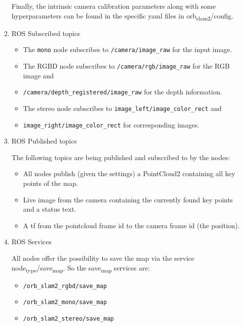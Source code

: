 \documentclass[unrestricted]{meetingnotesminutes}
\begin{document}
\begin{enumerate}
Finally, the intrinsic camera calibration parameters along with some hyperparameters can be found in the specific yaml files in orb\textsubscript{slam2}/config.

\item ROS Subscribed topics
\label{sec:org2778b5f}

\begin{itemize}
\item The \texttt{mono} node subscribes to \texttt{/camera/image\_raw} for the input image.
\item The RGBD node subscribes to \texttt{/camera/rgb/image\_raw} for the RGB image and
\item \texttt{/camera/depth\_registered/image\_raw} for the depth information.
\item The stereo node subscribes to \texttt{image\_left/image\_color\_rect} and
\item \texttt{image\_right/image\_color\_rect} for corresponding images.
\end{itemize}

\item ROS Published topics
\label{sec:org095f0d9}

The following topics are being published and subscribed to by the nodes:

\begin{itemize}
\item All nodes publish (given the settings) a PointCloud2 containing all key points of the map.
\item Live image from the camera containing the currently found key points and a status text.
\item A tf from the pointcloud frame id to the camera frame id (the position).
\end{itemize}

\item ROS Services
\label{sec:orgc107f8f}

All nodes offer the possibility to save the map via the service node\textsubscript{type}/save\textsubscript{map}. So the save\textsubscript{map} services are:

\begin{itemize}
\item \texttt{/orb\_slam2\_rgbd/save\_map}
\item \texttt{/orb\_slam2\_mono/save\_map}
\item \texttt{/orb\_slam2\_stereo/save\_map}
\end{itemize}
\end{enumerate}
\end{document}
